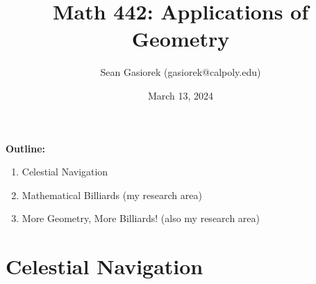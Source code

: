 \documentclass[compress,aspectratio=169,10pt,usenames,dvipsnames]{beamer}
\title[Math 442]{Math 442: Applications of Geometry \\ \;}
\author[Sean Gasiorek (gasiorek@calpoly.edu)]{Sean Gasiorek (gasiorek@calpoly.edu)}
\institute[Cal Poly]{}%
\date{March 13, 2024}
\begin{document}
\begin{frame}
\titlepage

\end{frame}


\begin{frame}
\textbf{Outline:}
\begin{enumerate}
	\item Celestial Navigation
	\item Mathematical Billiards (my research area)
	\item More Geometry, More Billiards! (also my research area)
\end{enumerate}
\end{frame}




\section{Celestial Navigation}
\begin{frame}
  \sectionpage
\end{frame}

\end{document}
